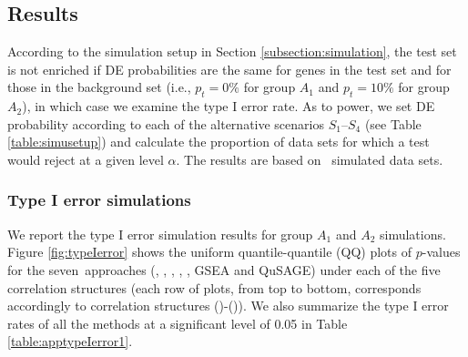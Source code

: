 	
	
	\subsection{Results}\label{section:results}
	
	According to the simulation setup in Section \ref{subsection:simulation}, the test set is not
	enriched if DE probabilities are the same for genes in the test set and for those in the 
	background set (i.e., $p_t =0\%$ for group $A_1$ and $p_t = 10\%$ for group $A_2$), in which 
	case we	examine the type I error rate. As to power, we set DE probability according to each of 
	the alternative scenarios $S_1$--$S_4$ (see Table \ref{table:simusetup}) and calculate the 
	proportion of data sets for which a test would reject at a given level $\alpha$. The results 
	are based on \HowmanySimu~simulated data sets. 
	
	
	
	\subsubsection{Type I error simulations}\label{subsection:typeIerror}
	
	
	We report the type I error simulation results for group $A_1$ and $A_2$ simulations. Figure
	\ref{fig:typeIerror} shows the uniform quantile-quantile (QQ) plots of $p$-values for the
	seven~approaches (\OurMethod, \gent, \genr, \CMT, \CMR, GSEA and QuSAGE) under each of the five
	correlation structures (each row of plots, from top to
	bottom, corresponds accordingly to correlation structures (\aaCase)-(\fCase)). We also 
	summarize the type I error rates of all the methods at a significant level of 0.05 in 
	Table \ref{table:apptypeIerror1}.
			
